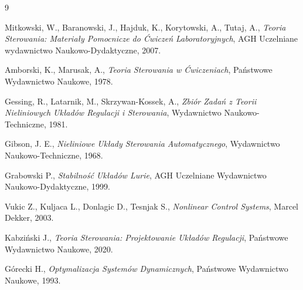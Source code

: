 \documentclass{article}
\begin{document}
\newpage
\begin{thebibliography}{9}

  Mitkowski, W., Baranowski, J., Hajduk, K., Korytowski, A., Tutaj, A.,
  \emph{Teoria Sterowania: Materiały Pomocnicze do Ćwiczeń Laboratoryjnych},
  AGH Uczelniane wydawnictwo Naukowo-Dydaktyczne,
  2007.

  Amborski, K., Marusak, A.,
  \emph{Teoria Sterowania w Ćwiczeniach},
  Państwowe Wydawnictwo Naukowe,
  1978.

  Gessing, R., Latarnik, M., Skrzywan-Kossek, A.,
  \emph{Zbiór Zadań z Teorii Nieliniowych Układów Regulacji i Sterowania},
  Wydawnictwo Naukowo-Techniczne,
  1981.

  Gibson, J. E.,
  \emph{Nieliniowe Układy Sterowania Automatycznego},
  Wydawnictwo Naukowo-Techniczne,
  1968.

  Grabowski P.,
  \emph{Stabilność Układów Lurie},
  AGH Uczelniane Wydawnictwo Naukowo-Dydaktyczne,
  1999.


  Vukic Z., Kuljaca L., Donlagic D., Tesnjak S.,
  \emph{Nonlinear Control Systems},
  Marcel Dekker,
  2003.

  Kabziński J.,
  \emph{Teoria Sterowania: Projektowanie Układów Regulacji},
  Państwowe Wydawnictwo Naukowe,
  2020.

  Górecki H.,
  \emph{Optymalizacja Systemów Dynamicznych},
  Państwowe Wydawnictwo Naukowe,
  1993.

\end{thebibliography}
\end{document}
